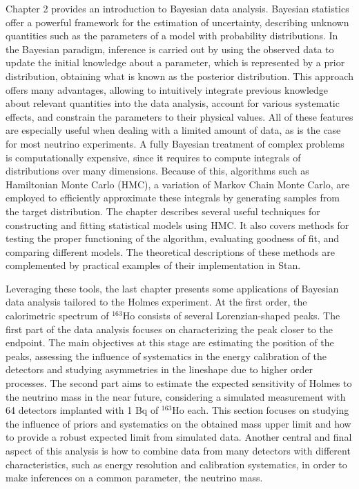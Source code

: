 Chapter 2 provides an introduction to Bayesian data analysis. Bayesian statistics offer a powerful framework for the estimation of uncertainty, describing unknown quantities such as the parameters of a model with probability distributions. In the Bayesian paradigm, inference is carried out by using the observed data to update the initial knowledge about a parameter, which is represented by a prior distribution, obtaining what is known as the posterior distribution. This approach offers many advantages, allowing to intuitively integrate previous knowledge about relevant quantities into the data analysis, account for various systematic effects, and constrain the parameters to their physical values. All of these features are especially useful when dealing with a limited amount of data, as is the case for most neutrino experiments. A fully Bayesian treatment of complex problems is computationally expensive, since it requires to compute integrals of distributions over many dimensions. Because of this, algorithms such as Hamiltonian Monte Carlo (HMC), a variation of Markov Chain Monte Carlo, are employed to efficiently approximate these integrals by generating samples from the target distribution. The chapter describes several useful techniques for constructing and fitting statistical models using HMC. It also covers methods for testing the proper functioning of the algorithm, evaluating goodness of fit, and comparing different models. The theoretical descriptions of these methods are complemented by practical examples of their implementation in Stan.

Leveraging these tools, the last chapter presents some applications of Bayesian data analysis tailored to the Holmes experiment. At the first order, the calorimetric spectrum of \(^{163}\)Ho consists of several Lorenzian-shaped peaks. The first part of the data analysis focuses on characterizing the peak closer to the endpoint. The main objectives at this stage are estimating the position of the peaks, assessing the influence of systematics in the energy calibration of the detectors and studying asymmetries in the lineshape due to higher order processes. The second part aims to estimate the expected sensitivity of Holmes to the neutrino mass in the near future, considering a simulated measurement with 64 detectors implanted with 1 Bq of \(^{163}\)Ho each. This section focuses on studying the influence of priors and systematics on the obtained mass upper limit and how to provide a robust expected limit from simulated data. Another central and final aspect of this analysis is how to combine data from many detectors with different characteristics, such as energy resolution and calibration systematics, in order to make inferences on a common parameter, the neutrino mass.
